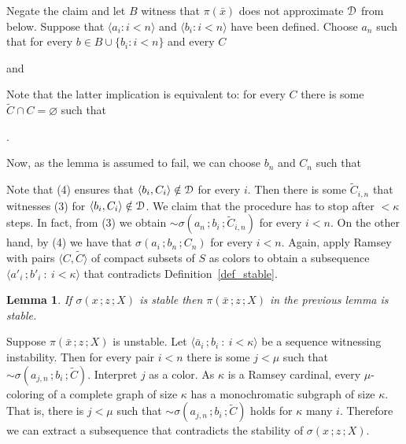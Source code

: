 \documentclass{amsproc}
\makeatletter
\newcounter{thm}
\theoremstyle{mio}
\newtheorem{lemma}[thm]{Lemma}\tcolorboxenvironment{lemma}{mythm}
\providecommand{\proofNameStyle}{\bfseries}
\renewenvironment{proof}[1][\proofname]{\par
  \pushQED{\qed}%
  \normalfont%
  \trivlist
  \item[\hskip\labelsep
        \proofNameStyle
    #1\@addpunct{.}]\ignorespaces
}{%
  \popQED\endtrivlist\@endpefalse
}
\makeatother
\begin{document}
\begin{proof}
  Negate the claim and let $B$ witness that $\pi(\bar x)$ does not approximate ${\EuScript D}$ from below.
  Suppose that $\langle a_i:i<n\rangle$ and $\langle b_i:i<n\rangle$ have been defined.
  Choose $a_n$ such that for every $b\in B\cup\{b_i:i<n\}$ and every $C$

  \quad and

  
  Note that the latter implication is equivalent to: for every $C$ there is some  $\tilde C\cap C=\varnothing$ such that 
  
  .%

  Now, as the lemma is assumed to fail, we can choose $b_n$ and $C_n$ such that


  Note that (4) ensures that $\langle b_i,C_i\rangle\notin{\EuScript D}$ for every $i$.
  Then there is some $\tilde C_{i,n}$ that witnesses (3) for $\langle b_i,C_i\rangle\notin{\EuScript D}$.
  We claim that the procedure has to stop after $<\kappa$ steps.
  In fact, from (3) we obtain ${\sim}\sigma(a_n\,;b_i\,;\tilde C_{i,n})$ for every $i<n$.
  On the other hand, by (4) we have that $\sigma(a_i\,;b_n\,;C_n)$ for every $i<n$.
  Again, apply Ramsey with pairs $\langle C,\tilde C\rangle$ of compact subsets of $S$ as colors to obtain a subsequence $\langle a'_i\,;b'_i\ :\ i<\kappa\rangle$ that contradicts Definition~\ref{def_stable}.
\end{proof}

\begin{lemma}\label{lem_sigma_stable}
  If $\sigma(x\,;z\,;X)$ is stable then $\pi(\bar x\,;z\,;X)$ in the previous lemma is stable.
\end{lemma}

\begin{proof}
  Suppose $\pi(\bar x\,;z\,;X)$ is unstable.
  Let $\langle \bar a_i\,;b_i\ :\ i<\kappa\rangle$ be a sequence witnessing instability.
  Then for every pair $i<n$ there is some $j<\mu$ such that ${\sim}\sigma(a_{j,n}\,;b_i\,;\tilde C)$.
  Interpret $j$ as a color. 
  As $\kappa$ is a Ramsey cardinal, every $\mu$-coloring of a complete graph of size $\kappa$ has a monochromatic subgraph of size $\kappa$.
  That is, there is $j<\mu$ such that ${\sim}\sigma(a_{j,n}\,;b_i\,;\tilde C)$ holds for $\kappa$ many $i$.
  Therefore we can extract a subsequence that contradicts the stability of $\sigma(x\,;z\,;X)$.
\end{proof}
\end{document}
